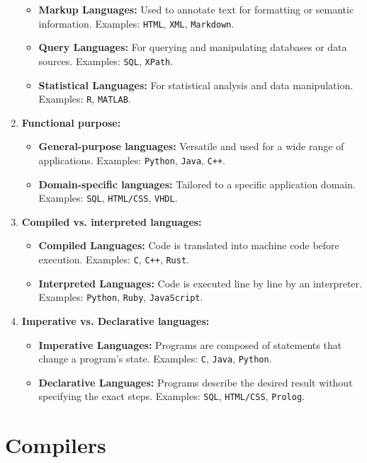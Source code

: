 \begin{enumerate}
    \begin{itemize}
        \item \textbf{Markup Languages:} Used to annotate text for formatting or semantic information. Examples: \texttt{HTML}, \texttt{XML}, \texttt{Markdown}.
        \item \textbf{Query Languages:} For querying and manipulating databases or data sources. Examples: \texttt{SQL}, \texttt{XPath}.
        \item \textbf{Statistical Languages:} For statistical analysis and data manipulation. Examples: \texttt{R}, \texttt{MATLAB}.
    \end{itemize}
    \item \textbf{Functional purpose:}
    \begin{itemize}
        \item \textbf{General-purpose languages:} Versatile and used for a wide range of applications. Examples: \texttt{Python}, \texttt{Java}, \texttt{C++}.
        \item \textbf{Domain-specific languages:} Tailored to a specific application domain. Examples: \texttt{SQL}, \texttt{HTML/CSS}, \texttt{VHDL}.
    \end{itemize}
    \item \textbf{Compiled vs. interpreted languages:}
    \begin{itemize}
        \item \textbf{Compiled Languages:} Code is translated into machine code before execution. Examples: \texttt{C}, \texttt{C++}, \texttt{Rust}.
        \item \textbf{Interpreted Languages:} Code is executed line by line by an interpreter. Examples: \texttt{Python}, \texttt{Ruby}, \texttt{JavaScript}.
    \end{itemize}
    \item \textbf{Imperative vs. Declarative languages:}
    \begin{itemize}
        \item \textbf{Imperative Languages:} Programs are composed of statements that change a program’s state. Examples: \texttt{C}, \texttt{Java}, \texttt{Python}.
        \item \textbf{Declarative Languages:} Programs describe the desired result without specifying the exact steps. Examples: \texttt{SQL}, \texttt{HTML/CSS}, \texttt{Prolog}.
    \end{itemize}
\end{enumerate}

\section{Compilers}

